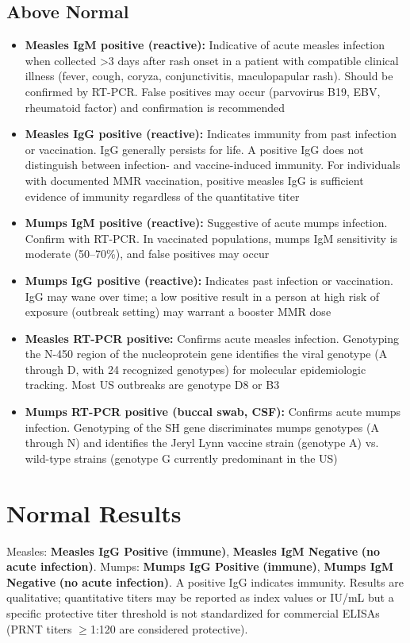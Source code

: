 \subsection*{Above Normal}
\begin{itemize}
  \item \textbf{Measles IgM positive (reactive):} Indicative of acute measles infection when collected >3 days after rash onset in a patient with compatible clinical illness (fever, cough, coryza, conjunctivitis, maculopapular rash). Should be confirmed by RT-PCR. False positives may occur (parvovirus B19, EBV, rheumatoid factor) and confirmation is recommended
  \item \textbf{Measles IgG positive (reactive):} Indicates immunity from past infection or vaccination. IgG generally persists for life. A positive IgG does not distinguish between infection- and vaccine-induced immunity. For individuals with documented MMR vaccination, positive measles IgG is sufficient evidence of immunity regardless of the quantitative titer
  \item \textbf{Mumps IgM positive (reactive):} Suggestive of acute mumps infection. Confirm with RT-PCR. In vaccinated populations, mumps IgM sensitivity is moderate (50--70\%), and false positives may occur
  \item \textbf{Mumps IgG positive (reactive):} Indicates past infection or vaccination. IgG may wane over time; a low positive result in a person at high risk of exposure (outbreak setting) may warrant a booster MMR dose
  \item \textbf{Measles RT-PCR positive:} Confirms acute measles infection. Genotyping the N-450 region of the nucleoprotein gene identifies the viral genotype (A through D, with 24 recognized genotypes) for molecular epidemiologic tracking. Most US outbreaks are genotype D8 or B3
  \item \textbf{Mumps RT-PCR positive (buccal swab, CSF):} Confirms acute mumps infection. Genotyping of the SH gene discriminates mumps genotypes (A through N) and identifies the Jeryl Lynn vaccine strain (genotype A) vs. wild-type strains (genotype G currently predominant in the US)
\end{itemize}

\section*{Normal Results}
Measles: \textbf{Measles IgG Positive} \textbf{(immune)}, \textbf{Measles IgM Negative} \textbf{(no acute infection)}. Mumps: \textbf{Mumps IgG Positive} \textbf{(immune)}, \textbf{Mumps IgM Negative} \textbf{(no acute infection)}. A positive IgG indicates immunity. Results are qualitative; quantitative titers may be reported as index values or IU/mL but a specific protective titer threshold is not standardized for commercial ELISAs (PRNT titers $\geq$1:120 are considered protective).

